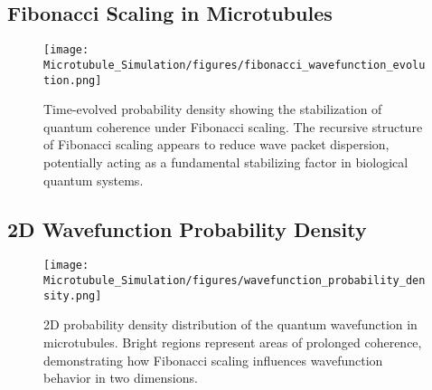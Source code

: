 \documentclass[entropy,article,submit,oneauthor,pdftex,]{Definitions/mdpi}
\begin{document}
\subsection{Fibonacci Scaling in Microtubules}
\begin{figure}[H]
    \centering
    \texttt{[image: Microtubule\_Simulation/figures/fibonacci\_wavefunction\_evolution.png]}
    \caption{Time-evolved probability density showing the stabilization of quantum coherence under Fibonacci scaling. The recursive structure of Fibonacci scaling appears to reduce wave packet dispersion, potentially acting as a fundamental stabilizing factor in biological quantum systems.}
    \label{fig:fibonacci_scaling}
\end{figure}
\subsection{2D Wavefunction Probability Density}
\begin{figure}[H]
    \centering
    \texttt{[image: Microtubule\_Simulation/figures/wavefunction\_probability\_density.png]}
    \caption{2D probability density distribution of the quantum wavefunction in microtubules. Bright regions represent areas of prolonged coherence, demonstrating how Fibonacci scaling influences wavefunction behavior in two dimensions.}
    \label{fig:wavefunction_2D}
\end{figure}
\end{document}
